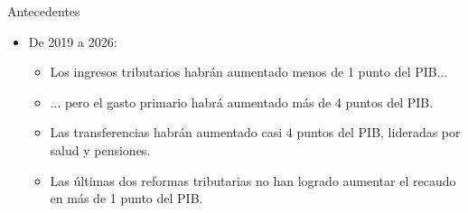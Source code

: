 \begin{frame}{Antecedentes}
\begin{itemize}
    \item  De 2019 a 2026: 
    \begin{itemize}
        \item Los ingresos tributarios habrán aumentado menos de 1 punto del PIB...
        \item ... pero el gasto primario habrá aumentado más de 4 puntos del PIB.
        \item Las transferencias habrán aumentado casi 4 puntos del PIB, lideradas por salud y pensiones.
        \item Las últimas dos reformas tributarias no han logrado aumentar el recaudo en más de 1 punto del PIB.
    \end{itemize}
\end{itemize}
\end{frame}
